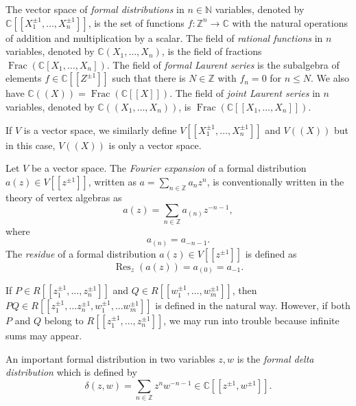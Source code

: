 \documentclass[a4paper, 12pt, reqno]{amsart}
\theoremstyle{remark}
\numberwithin{equation}{subsection}
\DeclareMathOperator{\Frac}{Frac}
\DeclareMathOperator{\Res}{Res}
\begin{document}
The vector space of \emph{formal distributions} in $n \in \mathbb{N}$ variables, denoted by $\mathbb{C}[[X_1^{\pm 1}, \dots, X_n^{\pm 1}]]$, is the set of functions $f: \mathbb{Z}^n \to \mathbb{C}$ with the natural operations of addition and multiplication by a scalar.
The field of \emph{rational functions} in $n$ variables, denoted by $\mathbb{C}(X_1, \dots, X_n)$, is the field of fractions $\Frac(\mathbb{C}[X_1, \dots, X_n])$.
The field of \emph{formal Laurent series} is the subalgebra of elements $f \in \mathbb{C}[[Z^{\pm 1}]]$ such that there is $N \in \mathbb{Z}$ with $f_n = 0$ for $n \le N$.
We also have $\mathbb{C}((X)) = \Frac(\mathbb{C}[[X]])$.
The field of \emph{joint Laurent series} in $n$ variables, denoted by $\mathbb{C}((X_1, \dots, X_n))$, is $\Frac(\mathbb{C}[[X_1, \dots, X_n]])$.

If $V$ is a vector space, we similarly define $V[[X_1^{\pm 1}, \dots, X_n^{\pm 1}]]$ and $V((X))$ but in this case, $V((X))$ is only a vector space.

Let $V$ be a vector space.
The \emph{Fourier expansion} of a formal distribution $a(z) \in V[[z^{\pm 1}]]$, written as $a = \sum_{n \in \mathbb{Z}} a_nz^n$, is conventionally written in the theory of vertex algebras as
\begin{equation*}
  a(z) = \sum_{n \in \mathbb{Z}}a_{(n)}z^{-n - 1},
\end{equation*}
where
\begin{equation*}
  a_{(n)} = a_{-n-1}.
\end{equation*}
The \emph{residue} of a formal distribution $a(z) \in V[[z^{\pm 1}]]$ is defined as
\begin{equation*}
  \Res_z(a(z)) = a_{(0)} = a_{-1}.
\end{equation*}

If $P\in R[[z_1^{\pm 1},\dots, z_n^{\pm 1}]]$ and $Q\in R[[w_1^{\pm 1},\dots, w_m^{\pm 1}]]$, then $PQ\in R[[z_1^{\pm 1},\dots z_n^{\pm 1},w_1^{\pm 1},\dots w_m^{\pm 1}]]$ is defined in the natural way.
However, if both $P$ and $Q$ belong to $R[[z_1^{\pm 1},\dots, z_n^{\pm 1}]]$, we may run into trouble because infinite sums may appear.

An important formal distribution in two variables $z, w$ is the \emph{formal delta distribution} which is defined by
\begin{equation*}
  \delta(z, w) = \sum_{n \in \mathbb{Z}}z^nw^{-n - 1} \in \mathbb{C}[[z^{\pm 1}, w^{\pm 1}]].
\end{equation*}
\end{document}
